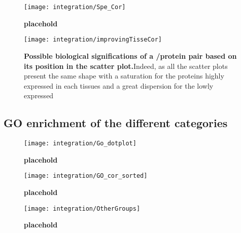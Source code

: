 

\begin{figure}[!htbp]
    \texttt{[image: integration/Spe\_Cor]}\centering
    \caption[placehold]{\label{fig:Spe_Cor}\textbf{placehold}}
\end{figure}



\begin{figure}[!htbp]
    \texttt{[image: integration/improvingTisseCor]}\centering
    \caption[Possible biological significations of a \mRNA/protein pair based on
    its possition in the scatter plot]
    {\label{fig:CorImprovable}\textbf{Possible biological significations of a
    \mRNA/protein pair based on its position in the scatter plot.}Indeed, as all
    the scatter plots present the same shape with a saturation for the proteins
    highly expressed in each tissues and a great dispersion for the lowly
    expressed \mRNAs}
\end{figure}




\subsection{GO enrichment of the different categories}


\begin{figure}[!htbp]
\texttt{[image: integration/Go\_dotplot]}\centering
    \caption[placehold]{\label{fig:Go_dotplot}\textbf{placehold}}
\end{figure}


\begin{figure}[!htbp]
\texttt{[image: integration/GO\_cor\_sorted]}\centering
    \caption[placehold]{\label{fig:GO_cor_sorted}\textbf{placehold}}
\end{figure}


\begin{figure}[!htbp]
\texttt{[image: integration/OtherGroups]}\centering
    \caption[placehold]{\label{fig:GO_sub_groups}\textbf{placehold}}
\end{figure}


